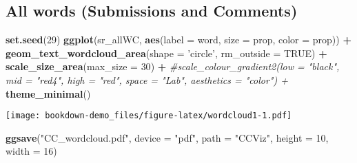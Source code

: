 \documentclass[
]{book}
\newenvironment{Shaded}{\begin{snugshade}}{\end{snugshade}}
\newcommand{\CommentTok}[1]{\textcolor[rgb]{0.56,0.35,0.01}{\textit{#1}}}
\newcommand{\DataTypeTok}[1]{\textcolor[rgb]{0.13,0.29,0.53}{#1}}
\newcommand{\DecValTok}[1]{\textcolor[rgb]{0.00,0.00,0.81}{#1}}
\newcommand{\KeywordTok}[1]{\textcolor[rgb]{0.13,0.29,0.53}{\textbf{#1}}}
\newcommand{\NormalTok}[1]{#1}
\newcommand{\OperatorTok}[1]{\textcolor[rgb]{0.81,0.36,0.00}{\textbf{#1}}}
\newcommand{\OtherTok}[1]{\textcolor[rgb]{0.56,0.35,0.01}{#1}}
\newcommand{\StringTok}[1]{\textcolor[rgb]{0.31,0.60,0.02}{#1}}
\begin{document}
\hypertarget{all-words-submissions-and-comments}{%
\subsection{All words (Submissions and Comments)}\label{all-words-submissions-and-comments}}

\begin{Shaded}
\end{Shaded}

\begin{Shaded}
\begin{Highlighting}[]
\KeywordTok{set.seed}\NormalTok{(}\DecValTok{29}\NormalTok{)}
\KeywordTok{ggplot}\NormalTok{(sr_allWC, }\KeywordTok{aes}\NormalTok{(}\DataTypeTok{label =}\NormalTok{ word, }\DataTypeTok{size =}\NormalTok{ prop, }\DataTypeTok{color =}\NormalTok{ prop)) }\OperatorTok{+}
\StringTok{    }\KeywordTok{geom_text_wordcloud_area}\NormalTok{(}\DataTypeTok{shape =} \StringTok{'circle'}\NormalTok{, }\DataTypeTok{rm_outside =} \OtherTok{TRUE}\NormalTok{) }\OperatorTok{+}
\StringTok{    }\KeywordTok{scale_size_area}\NormalTok{(}\DataTypeTok{max_size =} \DecValTok{30}\NormalTok{) }\OperatorTok{+}
\StringTok{    }\CommentTok{#scale_colour_gradient2(low = "black", mid = "red4", high = "red", space = "Lab", aesthetics = "color") +}
\StringTok{    }\KeywordTok{theme_minimal}\NormalTok{()}
\end{Highlighting}
\end{Shaded}

\texttt{[image: bookdown-demo\_files/figure-latex/wordcloud1-1.pdf]}

\begin{Shaded}
\begin{Highlighting}[]
\KeywordTok{ggsave}\NormalTok{(}\StringTok{"CC_wordcloud.pdf"}\NormalTok{, }\DataTypeTok{device =} \StringTok{"pdf"}\NormalTok{, }\DataTypeTok{path =} \StringTok{"CCViz"}\NormalTok{, }\DataTypeTok{height =} \DecValTok{10}\NormalTok{, }\DataTypeTok{width =} \DecValTok{16}\NormalTok{)}
\end{Highlighting}
\end{Shaded}
\end{document}
